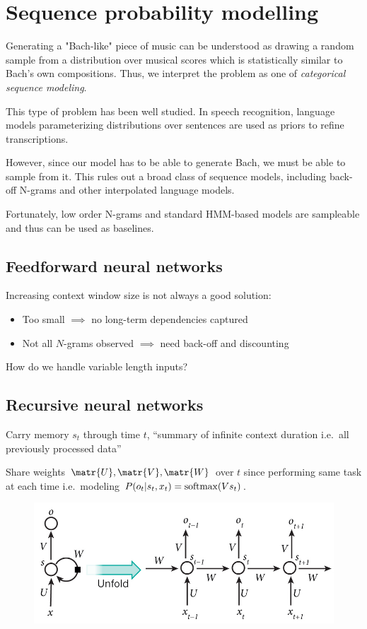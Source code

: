 \chapter{Sequence probability modelling}

Generating a "Bach-like" piece of music can be understood as drawing a random
sample from a distribution over musical scores which is statistically similar
to Bach's own compositions. Thus, we interpret the problem as one of
\emph{categorical sequence modeling}.

This type of problem has been well studied. In speech recognition, language
models parameterizing distributions over sentences are used as priors to refine
transcriptions.

However, since our model has to be able to generate Bach, we must be able to
sample from it. This rules out a broad class of sequence models, including
back-off N-grams and other interpolated language models.

Fortunately, low order N-grams and standard HMM-based models are sampleable and
thus can be used as baselines.

\section{Feedforward neural networks}

Increasing context window size is not always a good solution:
\begin{itemize}
    \item Too small $\implies$ no long-term dependencies captured
    \item Not all $N$-grams observed $\implies$ need back-off and discounting
\end{itemize}

How do we handle variable length inputs?

\section{Recursive neural networks}

Carry memory $s_t$ through time $t$, ``summary of infinite context duration
i.e.\ all previously processed data''

Share weights $\matr{U}, \matr{V}, \matr{W}$ over $t$ since performing same
task at each time i.e.\ modeling $P(o_t | s_t, x_t) = \operatorname*{softmax}(V s_t)$.

\begin{figure}[htpb]
    \centering
    \includegraphics[width=0.8\linewidth]{Figures/rnn.jpg}
    \caption{}
\end{figure}

